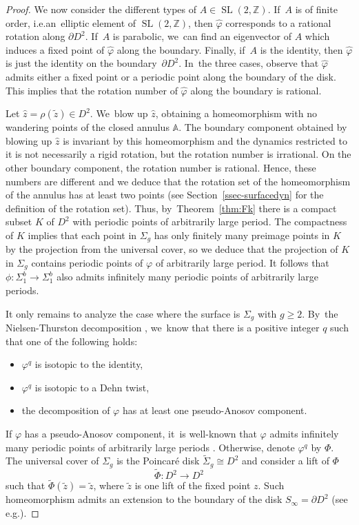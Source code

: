 \documentclass[10pt]{amsart}
\DeclareMathOperator{\SL}{SL}
\theoremstyle{definition}
\providecommand{\eg}{e.g.}\providecommand{\ie}{i.e.}\providecommand{\etc}{etc.}\providecommand{\resp}{resp.}\providecommand{\cf}{cf.}
\begin{document}
\begin{proof}
We now consider the different types of $A\in \SL(2,\mathbb{Z})$. If~$A$ is of finite order, \ie an~elliptic element of $\SL(2,\mathbb{Z})$, then $\widehat \varphi$ corresponds to a rational rotation along $\partial D^2$. If~$A$ is parabolic, we~can find an eigenvector of $A$ which induces a fixed point of $\widehat \varphi$ along the boundary. Finally, if~$A$ is the identity, then $\widehat \varphi$ is just the identity on the boundary~$\partial D^2$. In~the three cases, observe that $\widehat \varphi$ admits either a fixed point or a periodic point along the boundary of the disk. This implies that the rotation number of $\widehat \varphi$ along the boundary is rational.

Let $\hat z=\rho(\widetilde z)\in D^2$. We~blow up $\hat z$, obtaining a homeomorphism with no wandering points of the closed annulus $\mathbb{A}$. The boundary component obtained by blowing up $\hat z$ is invariant by this homeomorphism and the dynamics restricted to it is not necessarily a rigid rotation, but the rotation number is irrational. On the other boundary component, the rotation number is rational. Hence, these numbers are different and we deduce that the rotation set of the homeomorphism of the annulus has at least two points (see Section~\ref{ssec-surfacedyn} for the definition of the rotation set). Thus, by~Theorem~\ref{thm:Fk} there is a compact subset $K$ of $D^2$ with periodic points of arbitrarily large period. The compactness of $K$ implies that each point in $\Sigma_g$ has only finitely many preimage points in $K$ by the projection from the universal cover, so we deduce that the projection of $K$ in $\Sigma_g$ contains periodic points of $\varphi$ of arbitrarily large period. It follows that $\phi:\Sigma_1^b \to \Sigma_1^b$ also admits infinitely many periodic points of arbitrarily large periods.

It only remains to analyze the case where the surface is $\Sigma_g$ with $g \geq 2$. By~the Nielsen-Thurston decomposition \cite{T, FLP}, we~know that there is a positive integer $q$ such that one of the following holds:
\begin{itemize}
\item
$\varphi^q$ is isotopic to the identity,
\item
$\varphi^q$ is isotopic to a Dehn twist,
\item
the decomposition of $\varphi$ has at least one pseudo-Anosov component.
\end{itemize}
If $\varphi$ has a pseudo-Anosov component, it~is well-known that $\varphi$ admits infinitely many periodic points of arbitrarily large periods \cite{Ha}. Otherwise, denote $\varphi^q$ by $\Phi$. The universal cover of $\Sigma_g$ is the Poincaré disk $\widetilde \Sigma_g \cong D^2$ and consider a lift of $\Phi$
\[
\widetilde \Phi: D^2 \to D^2
\]
such that $\widetilde \Phi(\widetilde z)=\widetilde z$, where $\widetilde z$ is one lift of the fixed point $z$. Such homeomorphism admits an extension to the boundary of the disk $S_\infty=\partial D^2$ (see \eg \cite[Cor.\,1.2]{T}).


\end{proof}
\end{document}
